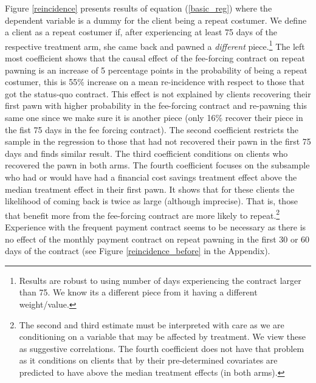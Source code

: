 \documentclass[oneside,11pt]{article}
\begin{document}
Figure \ref{reincidence} presents results of equation (\ref{basic_reg}) where the dependent variable is a dummy for the client being a repeat costumer. We define a client as a repeat costumer if, after experiencing at least 75 days of the respective treatment arm, she came back and pawned a \textit{different} piece.\footnote{Results are robust to using number of days experiencing the contract larger than 75. We know its a different piece from it having a different weight/value.}  The left most coefficient shows that the causal effect of the fee-forcing contract on repeat pawning is an increase of 5 percentage points in the probability of being a repeat costumer, this is 55\% increase on a mean re-incidence with respect to those that got the status-quo contract. This effect is not explained by clients recovering their first pawn with higher probability in the fee-forcing contract and re-pawning this same one since we make sure it is another piece (only 16\% recover their piece in the fist 75 days in the fee forcing contract). The second coefficient restricts the sample in the regression to those that had not recovered their pawn in the first 75 days and finds similar result. The third coefficient conditions on clients who recovered the pawn in both arms. The fourth coefficient focuses on the subsample who had or would have had a financial cost savings treatment effect above the median treatment effect in their first pawn. It shows that for these clients the likelihood of coming back is twice as large (although imprecise). That is, those that benefit more from the fee-forcing contract are more likely to repeat.\footnote{The second and third estimate must be interpreted with care as we are conditioning on a variable that may be affected by treatment. We view these as suggestive correlations. The fourth coefficient does not have that problem as it conditions on clients that by their pre-determined covariates are predicted to have above the median treatment effects (in both arms).} Experience with the frequent payment contract seems to be necessary as there is no effect of the monthly payment contract on repeat pawning in the first 30 or 60 days of the contract (see Figure \ref{reincidence_before} in the Appendix). %
\end{document}
